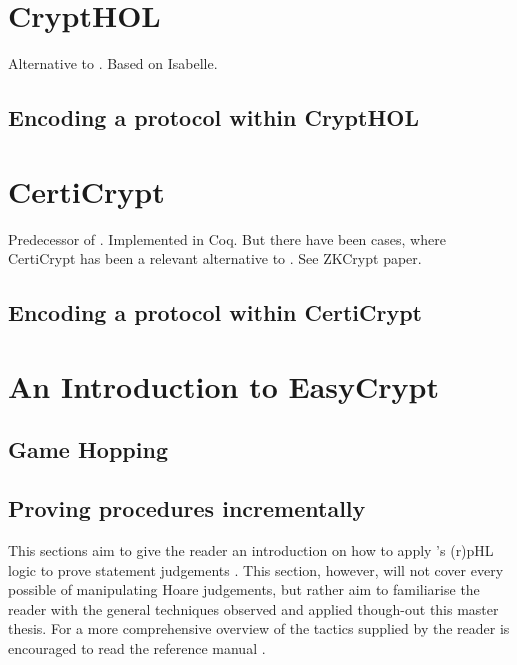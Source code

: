 \chapter{CryptHOL}
\label{ch:crypthol}
Alternative to \easycrypt. Based on Isabelle.


\section{Encoding a protocol within CryptHOL}
\label{sec:protocol_in_crypthol}


\chapter{CertiCrypt}
\label{ch:certicrypt}
Predecessor of \easycrypt. Implemented in Coq. But there have been cases, where CertiCrypt has been
a relevant alternative to \easycrypt. See ZKCrypt paper.

\section{Encoding a protocol within CertiCrypt}
\label{sec:protocol_in_certicrypt}

\chapter{An Introduction to EasyCrypt}
\label{sec:ec_introcution}

\section{Game Hopping}
\label{sec:game_hopping_ec}

\section{Proving procedures incrementally}
This sections aim to give the reader an introduction on how to
apply \easycrypt's (r)pHL logic to prove statement judgements .
This section, however, will not cover every possible of manipulating Hoare
judgements, but rather aim to familiarise the reader with the general techniques
observed and applied though-out this master thesis. For a more comprehensive
overview of the tactics supplied by \easycrypt the reader is encouraged to read
the reference manual \cite{ec-ref-man}.

